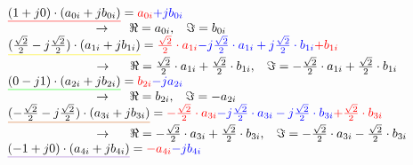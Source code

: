\vspace{1cm}

$\mathunderline{red}{(1+j0) \cdot (a_{0i}+jb_{0i})} = \textcolor{red}{a_{0i}} \textcolor{blue}{+jb_{0i}}$\\

$\hspace{2.5cm}\rightarrow \hspace{0.5cm} \Re=a_{0i}, \hspace{0.3cm}\Im=b_{0i}$\\

$\mathunderline{yellow}{(\frac{\sqrt{2}}{2}-j\frac{\sqrt{2}}{2}) \cdot (a_{1i}+jb_{1i})} = \textcolor{red}{\frac{\sqrt{2}}{2} \cdot a_{1i}} \textcolor{blue}{-j\frac{\sqrt{2}}{2} \cdot a_{1i} +j\frac{\sqrt{2}}{2} \cdot b_{1i}} \textcolor{red}{+b_{1i}}$\\

$\hspace{2.5cm}\rightarrow \hspace{0.5cm} \Re=\frac{\sqrt{2}}{2} \cdot a_{1i} + \frac{\sqrt{2}}{2} \cdot b_{1i}, \hspace{0.3cm} \Im=-\frac{\sqrt{2}}{2} \cdot a_{1i} +\frac{\sqrt{2}}{2} \cdot b_{1i}$\\

$\mathunderline{green}{(0-j1) \cdot (a_{2i}+jb_{2i})} = \textcolor{red}{b_{2i}}\textcolor{blue}{-ja_{2i}}$\\

$\hspace{2.5cm}\rightarrow \hspace{0.5cm} \Re=b_{2i}, \hspace{0.3cm}\Im=-a_{2i}$\\

$\mathunderline{cinnamon}{(-\frac{\sqrt{2}}{2}-j\frac{\sqrt{2}}{2}) \cdot (a_{3i}+jb_{3i})} = \textcolor{red}{-\frac{\sqrt{2}}{2} \cdot a_{3i}} \textcolor{blue}{-j\frac{\sqrt{2}}{2} \cdot a_{3i} -j\frac{\sqrt{2}}{2} \cdot b_{3i}} \textcolor{red}{+\frac{\sqrt{2}}{2} \cdot b_{3i}}$\\

$\hspace{2.5cm}\rightarrow \hspace{0.5cm} \Re=-\frac{\sqrt{2}}{2} \cdot a_{3i} +\frac{\sqrt{2}}{2} \cdot b_{3i}, \hspace{0.3cm} \Im=-\frac{\sqrt{2}}{2} \cdot a_{3i} -\frac{\sqrt{2}}{2} \cdot b_{3i}$\\

$\mathunderline{lila}{(-1+j0) \cdot (a_{4i}+jb_{4i})} = \textcolor{red}{-a_{4i}} \textcolor{blue}{-jb_{4i}}$\\

